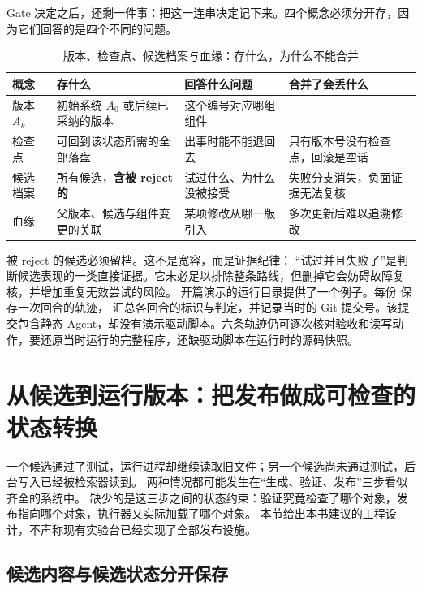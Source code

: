 Gate 决定之后，还剩一件事：把这一连串决定记下来。四个概念必须分开存，因为它们回答的是四个不同的问题。

\begin{table}[htbp]
\centering
\caption{版本、检查点、候选档案与血缘：存什么，为什么不能合并}
\label{tab:lineage}
\begin{tabular}{>{\raggedright\arraybackslash}p{2.2cm}>{\raggedright\arraybackslash}p{4.0cm}>{\raggedright\arraybackslash}p{4.0cm}>{\raggedright\arraybackslash}p{3.4cm}}
\toprule
概念 & 存什么 & 回答什么问题 & 合并了会丢什么 \\
\midrule
版本 $A_k$ & 初始系统 $A_0$ 或后续已采纳的版本 & 这个编号对应哪组组件 & — \\
检查点 & 可回到该状态所需的全部落盘 & 出事时能不能退回去 & 只有版本号没有检查点，回滚是空话 \\
候选档案 & 所有候选，\textbf{含被 reject 的} & 试过什么、为什么没被接受 & 失败分支消失，负面证据无法复核 \\
血缘 & 父版本、候选与组件变更的关联 & 某项修改从哪一版引入 & 多次更新后难以追溯修改 \\
\bottomrule
\end{tabular}
\end{table}

被 reject 的候选必须留档。这不是宽容，而是证据纪律：
“试过并且失败了”是判断候选表现的一类直接证据。它未必足以排除整条路线，但删掉它会妨碍故障复核，并增加重复无效尝试的风险。
开篇演示的运行目录提供了一个例子。每份  保存一次回合的轨迹， 汇总各回合的标识与判定，并记录当时的 Git 提交号。该提交包含静态 Agent，却没有演示驱动脚本。六条轨迹仍可逐次核对验收和读写动作，要还原当时运行的完整程序，还缺驱动脚本在运行时的源码快照。

\section{从候选到运行版本：把发布做成可检查的状态转换}
\label{sec:ch02-publication}

一个候选通过了测试，运行进程却继续读取旧文件；另一个候选尚未通过测试，后台写入已经被检索器读到。
两种情况都可能发生在``生成、验证、发布''三步看似齐全的系统中。
缺少的是这三步之间的状态约束：验证究竟检查了哪个对象，发布指向哪个对象，执行器又实际加载了哪个对象。
本节给出本书建议的工程设计，不声称现有实验台已经实现了全部发布设施。

\subsection{候选内容与候选状态分开保存}

